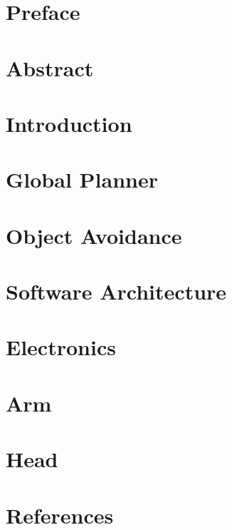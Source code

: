 \documentclass[a4paper,10pt,titlepage]{report}
\begin{document}

\newpage


\newpage
{}

\newcommand{\todo}[1]{\textbf{\textsc{\textcolor{red}{[#1]}}}}

\chapter{Preface}

\label{preface}
\newpage

\chapter{Abstract}

\label{abstract}
\newpage

\tableofcontents

\chapter{Introduction}

\label{introduction}
\newpage

\newpage
\chapter{Global Planner}

\label{global_planner}

\newpage
\chapter{Object Avoidance}

\label{object_avoidance}

\newpage
\chapter{Software Architecture}
\label{Software Architecture}


\newpage
\chapter{Electronics}

\label{electronics}

\newpage
\chapter{Arm}

\label{arm}

\newpage
\chapter{Head}

\label{head}

\newpage
\chapter{References}
\label{references}





\end{document}
